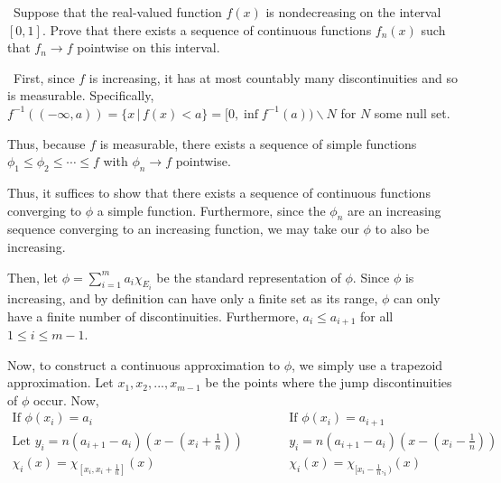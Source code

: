 \documentclass[12pt]{Qual}
\begin{document}
\begin{problem} $\,$
Suppose that the real-valued function $f(x)$ is nondecreasing on the interval $[0,1]$. Prove that there exists a sequence of continuous functions $f_n(x)$ such that $f_n\to f$ pointwise on this interval.
\end{problem}


\begin{solution}$\,$
First, since $f$ is increasing, it has at most countably many discontinuities and so is measurable. Specifically, $f^{-1}((-\infty,a))=\{x\,|\,f(x)<a\}=[0,\inf f^{-1}(a))\backslash N$ for $N$ some null set.

Thus, because $f$ is measurable, there exists a sequence of simple functions $\phi_1\le\phi_2\le\cdots\le f$ with $\phi_n\to f$ pointwise.

Thus, it suffices to show that there exists a sequence of continuous functions converging to $\phi$ a simple function. Furthermore, since the $\phi_n$ are an increasing sequence converging to an increasing function, we may take our $\phi$ to also be increasing.

Then, let $\phi=\sum_{i=1}^ma_i\chi_{E_i}$ be the standard representation of $\phi$. Since $\phi$ is increasing, and by definition can have only a finite set as its range, $\phi$ can only have a finite number of discontinuities. Furthermore, $a_i\le a_{i+1}$ for all $1\le i\le m-1$.

Now, to construct a continuous approximation to $\phi$, we simply use a trapezoid approximation. Let $x_1,x_2,...,x_{m-1}$ be the points where the jump discontinuities of $\phi$ occur. Now,
\[
    \begin{matrix}
    \text{If } \phi(x_i)=a_i & \qquad & \text{If } \phi(x_i)=a_{i+1}\\
    \text{Let } y_i=n(a_{i+1}-a_i)(x-(x_i+\frac{1}{n})) & \qquad & y_i=n(a_{i+1}-a_i)(x-(x_i-\frac{1}{n}))\\
    \chi_i(x)=\chi_{[x_i,x_i+\frac{1}{n}]}(x) & \qquad & \chi_i(x)=\chi_{[x_i-\frac{1}{n},_i)}(x)
    \end{matrix}
\]

\begin{center}
\end{center}


\end{solution}
\end{document}
